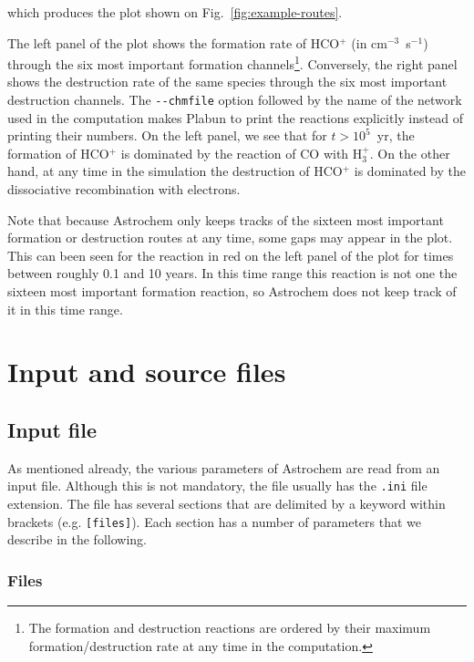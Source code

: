 \documentclass[a4paper,12pt]{article}
\begin{document}
\noindent
which produces the plot shown on Fig.~\ref{fig:example-routes}.

The left panel of the plot shows the formation rate of HCO$^{+}$ (in
cm$^{-3}$~s$^{-1}$) through the six most important formation
channels\footnote{The formation and destruction reactions are ordered
  by their maximum formation/destruction rate at any time in the
  computation.}. Conversely, the right panel shows the destruction
rate of the same species through the six most important destruction
channels. The \verb=--chmfile= option followed by the name of the
network used in the computation makes Plabun to print the reactions
explicitly instead of printing their numbers. On the left panel, we
see that for $t > 10^{5}$~yr, the formation of HCO$^{+}$ is dominated
by the reaction of CO with H$_{3}^{+}$. On the other hand, at any time
in the simulation the destruction of HCO$^{+}$ is dominated by the
dissociative recombination with electrons.

Note that because Astrochem only keeps tracks of the sixteen most
important formation or destruction routes at any time, some gaps may
appear in the plot. This can been seen for the reaction in red on the
left panel of the plot for times between roughly 0.1 and 10 years. In
this time range this reaction is not one the sixteen most important
formation reaction, so Astrochem does not keep track of it in this
time range.

\section{Input and source files}
\label{sec:input-source-files}

\subsection{Input file}
\label{sec:input-file}

As mentioned already, the various parameters of Astrochem are read
from an input file. Although this is not mandatory, the file usually
has the \verb=.ini= file extension. The file has several sections that
are delimited by a keyword within brackets (e.g. \verb=[files]=). Each
section has a number of parameters that we describe in the following.

\subsubsection{Files}
\label{sec:files}
\end{document}

